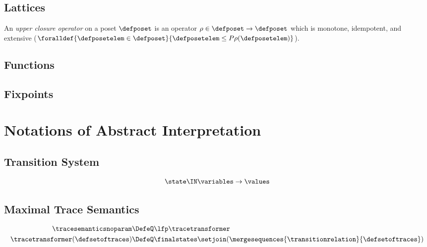 \subsection{Lattices}

\begin{definition}
  An \emph{upper closure operator} on a poset $\defposet$ is an operator $\rho\in\defposet\to\defposet$ which is monotone, idempotent, and extensive ($\foralldef{\defposetelem \in \defposet}{\defposetelem \le P \rho(\defposetelem)}$).
\end{definition}

\subsection{Functions}

\subsection{Fixpoints}

\section{Notations of Abstract Interpretation}

\subsection{Transition System}

\begin{definition}[State]
  \begin{align*}
    \state \IN \variables \to \values
  \end{align*}
\end{definition}

\subsection{Maximal Trace Semantics}

\begin{definition}
  \begin{align*}
    \tracesemanticsnoparam &\DefeQ \lfp \tracetransformer \\
    \tracetransformer(\defsetoftraces) &\DefeQ \finalstates \setjoin (\mergesequences{\transitionrelation}{\defsetoftraces})
  \end{align*}
\end{definition}

